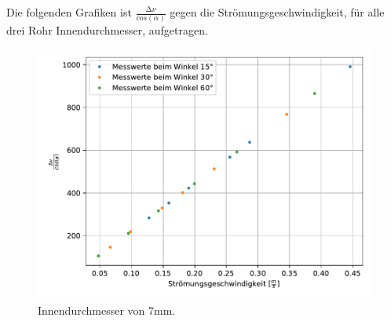 \noindent
Die folgenden Grafiken ist $\frac{\increment \nu}{cos(\alpha)}$ gegen die Strömungsgeschwindigkeit, für alle drei Rohr Innendurchmesser, aufgetragen.

\begin{figure}
    \centering
    \includegraphics{Daten/7mm.pdf}
    \caption{Innendurchmesser von 7mm.}
    \label{fig:KeineAhnung}
\end{figure}

